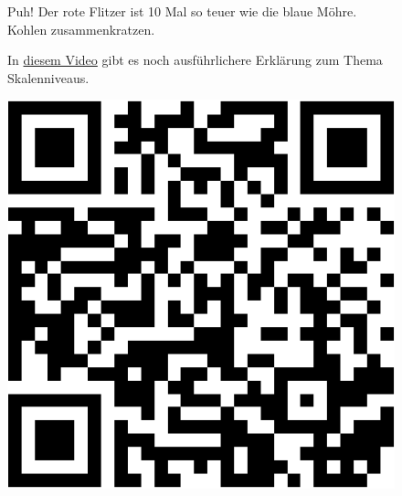 \documentclass[
  letterpaper,
]{scrbook}
\theoremstyle{definition}
\theoremstyle{definition}
\theoremstyle{definition}
\theoremstyle{remark}
\begin{document}
\begin{figure}


\caption{\label{fig-verhaeltnis}Puh! Der rote Flitzer ist 10 Mal so
teuer wie die blaue Möhre. Kohlen zusammenkratzen.}

\end{figure}%

\begin{figure}

\begin{minipage}{0.80\linewidth}
In \href{https://www.youtube.com/watch?v=_mN3kFe56ng}{diesem Video} gibt
es noch ausführlichere Erklärung zum Thema Skalenniveaus.\end{minipage}%
%
\begin{minipage}{0.20\linewidth}

\begin{center}
\includegraphics[width=0.75\linewidth,height=\textheight,keepaspectratio]{010-rahmen_files/figure-pdf/qr-youtube-skalenniveaus-1.pdf}
\end{center}

\end{minipage}%

\end{figure}%
\end{document}
